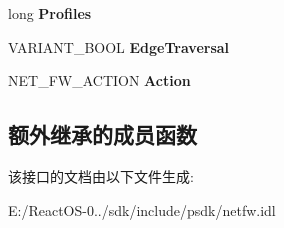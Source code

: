 \begin{DoxyCompactItemize}
long {\bfseries Profiles}
\item 
\mbox{\label{interface_i_net_fw_rule_a94efdaf35ef30a43686e5fab07f110b9}} 
V\+A\+R\+I\+A\+N\+T\+\_\+\+B\+O\+OL {\bfseries Edge\+Traversal}
\item 
\mbox{\label{interface_i_net_fw_rule_a74ecfcc252a9ce3f701ad233a746201b}} 
N\+E\+T\+\_\+\+F\+W\+\_\+\+A\+C\+T\+I\+ON {\bfseries Action}
\end{DoxyCompactItemize}
\subsection*{额外继承的成员函数}


该接口的文档由以下文件生成\+:\begin{DoxyCompactItemize}
\item 
E\+:/\+React\+O\+S-\/0../sdk/include/psdk/netfw.\+idl\end{DoxyCompactItemize}
